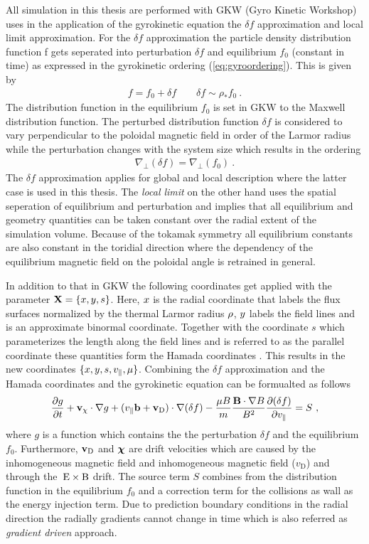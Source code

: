 All simulation in this thesis are performed with GKW (Gyro Kinetic Workshop) uses in the application of the gyrokinetic equation the $\delta f$ approximation and local limit approximation. For the $\delta f$ approximation the particle density distribution function f gets seperated into perturbation $\delta f$ and equilibrium $f_0$ (constant in time) as expressed in the gyrokinetic ordering (\ref{eq:gyroordering}). This is given by
\begin{gather}
	f = f_0 + \delta f \qquad \delta f \sim \rho_* f_0~.
\end{gather}
The distribution function in the equilibrium $f_0$ is set in GKW to the Maxwell distribution function. The perturbed distribution function $\delta f$ is considered to vary perpendicular to the poloidal magnetic field in order of the Larmor radius while the perturbation changes with the system size which results in the ordering
\begin{gather}
	\nabla_\perp(\delta f) = \nabla_\perp (f_0)~.
\end{gather}
The $\delta f$ approximation applies for global and local description where the latter case is used in this thesis.
The \textit{local limit} on the other hand uses the spatial seperation of equilibrium and perturbation and implies that all equilibrium and geometry quantities can be taken constant over the radial extent of the simulation volume. Because of the tokamak symmetry all equilibrium constants are also constant in the toridial direction where the dependency of the equilibrium magnetic field on the poloidal angle is retrained in general.

In addition to that in GKW the following coordinates get applied with the parameter $\boldsymbol{\mathbf{X}} = \{x, y, s\}$. Here, $x$ is the radial coordinate that labels the flux surfaces normalized by the thermal Larmor radius $\rho$, $y$ labels the field lines and is an approximate binormal coordinate. Together with the coordinate $s$ which parameterizes the length along the field lines and is referred to as the parallel coordinate these quantities form the Hamada coordinates \cite{Hamada1958}. This results in the new coordinates $\{x, y, s, v_\parallel, \mu\}$. Combining the $\delta f$ approximation and the Hamada coordinates and the gyrokinetic equation can be formualted as follows
\begin{gather}
	\frac{\partial g}{\partial t} + \boldsymbol{\mathbf{v}}_\chi \cdot \nabla g + (v_\parallel \boldsymbol{\mathbf{b}} + \boldsymbol{\mathbf{v}}_\mathrm{D}) \cdot \nabla(\delta f) - \frac{\mu B}{m}\frac{\boldsymbol{\mathbf{B}}\cdot\nabla B}{B^2}\frac{\partial (\delta f)}{\partial v_\parallel} = S~,
\end{gather}
where $g$ is a function which contains the the perturbation $\delta f$ and the equilibrium $f_0$. Furthermore, $\boldsymbol{\mathbf{v}}_\mathrm{D}$ and $\boldsymbol{\mathbf{\chi}}$ are drift velocities which are caused by the inhomogeneous magnetic field and inhomogeneous magnetic field (${v}_\mathrm{D}$) and through the $\mathrm{\:E}\times\mathrm{B}$ drift. The source term $S$ combines from the distribution function in the equilibrium $f_0$ and a correction term for the collisions as wall as the energy injection term. Due to prediction boundary conditions in the radial direction the radially gradients cannot change in time which is also referred as \textit{gradient driven} approach. \cite{Peeters2009}